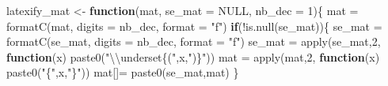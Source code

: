 \documentclass[
  10pt,
]{article}
\newenvironment{Shaded}{\begin{snugshade}}{\end{snugshade}}
\newcommand{\AttributeTok}[1]{\textcolor[rgb]{0.77,0.63,0.00}{#1}}
\newcommand{\ConstantTok}[1]{\textcolor[rgb]{0.00,0.00,0.00}{#1}}
\newcommand{\ControlFlowTok}[1]{\textcolor[rgb]{0.13,0.29,0.53}{\textbf{#1}}}
\newcommand{\DecValTok}[1]{\textcolor[rgb]{0.00,0.00,0.81}{#1}}
\newcommand{\FunctionTok}[1]{\textcolor[rgb]{0.00,0.00,0.00}{#1}}
\newcommand{\NormalTok}[1]{#1}
\newcommand{\OtherTok}[1]{\textcolor[rgb]{0.56,0.35,0.01}{#1}}
\newcommand{\SpecialCharTok}[1]{\textcolor[rgb]{0.00,0.00,0.00}{#1}}
\newcommand{\StringTok}[1]{\textcolor[rgb]{0.31,0.60,0.02}{#1}}
\begin{document}
\begin{Shaded}
\begin{Highlighting}[]
\NormalTok{latexify\_mat }\OtherTok{\textless{}{-}} \ControlFlowTok{function}\NormalTok{(mat, }\AttributeTok{se\_mat =} \ConstantTok{NULL}\NormalTok{, }\AttributeTok{nb\_dec =} \DecValTok{1}\NormalTok{)\{}
\NormalTok{    mat }\OtherTok{=} \FunctionTok{formatC}\NormalTok{(mat, }\AttributeTok{digits =}\NormalTok{ nb\_dec, }\AttributeTok{format =} \StringTok{"f"}\NormalTok{)}
    \ControlFlowTok{if}\NormalTok{(}\SpecialCharTok{!}\FunctionTok{is.null}\NormalTok{(se\_mat))\{}
\NormalTok{        se\_mat }\OtherTok{=} \FunctionTok{formatC}\NormalTok{(se\_mat, }\AttributeTok{digits =}\NormalTok{ nb\_dec, }\AttributeTok{format =} \StringTok{"f"}\NormalTok{)}
\NormalTok{        se\_mat }\OtherTok{=} \FunctionTok{apply}\NormalTok{(se\_mat,}\DecValTok{2}\NormalTok{,}
              \ControlFlowTok{function}\NormalTok{(x) }\FunctionTok{paste0}\NormalTok{(}\StringTok{"}\SpecialCharTok{\textbackslash{}\textbackslash{}}\StringTok{underset\{("}\NormalTok{,x,}\StringTok{")\}"}\NormalTok{))}
\NormalTok{        mat }\OtherTok{=} \FunctionTok{apply}\NormalTok{(mat,}\DecValTok{2}\NormalTok{,}
                    \ControlFlowTok{function}\NormalTok{(x) }\FunctionTok{paste0}\NormalTok{(}\StringTok{"\{"}\NormalTok{,x,}\StringTok{"\}"}\NormalTok{))}
\NormalTok{        mat[]}\OtherTok{=} \FunctionTok{paste0}\NormalTok{(se\_mat,mat)}
\NormalTok{    \}}
    

\end{Highlighting}
\end{Shaded}
\end{document}

